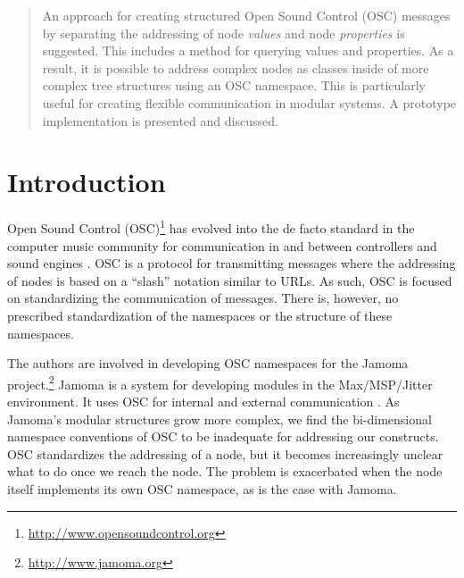 \documentclass{NIME-alternate}
\begin{document}
\maketitle



\begin{abstract}

An approach for creating structured Open Sound Control (OSC) messages by separating the addressing of node \emph{values} and node \emph{properties} is suggested. This includes a method for querying values and properties. As a result, it is possible to address complex nodes as classes inside of more complex tree structures using an OSC namespace. This is particularly useful for creating flexible communication in modular systems.  A prototype implementation is presented and discussed.

\end{abstract}




\section{Introduction} %
\label{sec:introduction}

Open Sound Control (OSC)\footnote{\url{http://www.opensoundcontrol.org}} has evolved into the de facto standard in the computer music community for communication in and between controllers and sound engines \cite{Wright:2003}. OSC is a protocol for transmitting messages where the addressing of nodes is based on a ``slash'' notation similar to URLs. As such, OSC is focused on standardizing the communication of messages. There is, however, no prescribed standardization of the namespaces or the structure of these namespaces. 

The authors are involved in developing OSC namespaces for the Jamoma  project.\footnote{\url{http://www.jamoma.org}} Jamoma is a system for developing  modules in the Max/MSP/Jitter environment. It uses OSC for internal and external communication \cite{Place:2006}.  As Jamoma's modular structures grow more complex, we find the bi-dimensional namespace conventions of OSC to be inadequate for addressing our constructs.  OSC standardizes the addressing of a node, but it becomes increasingly unclear what to do once we reach the node.  The problem is exacerbated when the node itself implements its own OSC namespace, as is the case with Jamoma.
\end{document}
